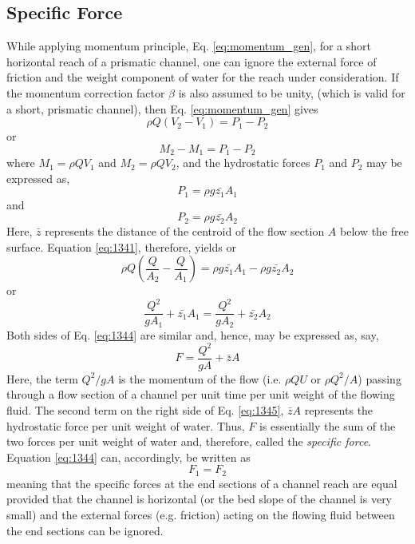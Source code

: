 \documentclass[a4paper, 12pt, british]{article} %
\numberwithin{equation}{section}
\numberwithin{figure}{section}
\numberwithin{table}{section}
\begin{document}
\subsection{Specific Force}
While applying momentum principle, Eq. \ref{eq:momentum_gen}, for a
short horizontal reach of a prismatic channel, one can
ignore the external force of friction and the weight
component of water for the reach under consideration. If the
momentum correction factor $\beta $ is also assumed to be
unity, (which is valid for a short, prismatic channel), then Eq. \ref{eq:momentum_gen}  gives 
\begin{equation}
\rho Q (V_2 - V_1) = P_1 - P_2
\label{eq:1341}
\end{equation}
or
\begin{equation*}
M_2 - M_1 = P_1 - P_2
\label{eq:1341a}
\end{equation*}
where $M_1 = \rho Q V_1$ and $M_2 = \rho Q V_2$, and
the hydrostatic forces $P_1$ and $P_2$ may be expressed as, 
\begin{equation}
P_1 = \rho g \bar{z_1} A_1
\label{eq:1342}
\end{equation}
and
\begin{equation}
P_2 = \rho g \bar{z_2} A_2
\label{eq:1343}
\end{equation}
Here, $\bar{z}$ represents the distance of the centroid of the flow
section $A$ below the free surface. Equation \ref{eq:1341}, therefore, yields
or
\begin{equation*}
\rho Q \left ( \frac{Q}{A_2} - \frac{Q}{A_1} \right ) = \rho g \bar{z_1} A_1 - \rho g \bar{z_2} A_2
\end{equation*}
or
\begin{equation}
\frac{Q^2}{g A_1} + \bar{z_1} A_1 = \frac{Q^2}{g A_2} + \bar{z_2} A_2
\label{eq:1344}
\end{equation}
Both sides of Eq. \ref{eq:1344} are similar and, hence, may
be expressed as, say, 
\begin{equation}
F = \frac{Q^2}{g A} + \bar{z} A
\label{eq:1345}
\end{equation}
Here, the term $Q^2 / g A$ is the momentum of the flow (i.e. $\rho Q U$ or $\rho Q^2 / A$) passing through a
flow section of a channel per unit time per unit weight of
the flowing fluid. The second term on the right side of Eq.
\ref{eq:1345}, $\bar{z}A$ represents the hydrostatic force per unit weight
of water. Thus, $F$ is essentially the sum of the two forces per
unit weight of water and, therefore, called the \emph{specific
	force}. Equation \ref{eq:1344} can, accordingly, be written as
\begin{equation*}
F_1 = F_2
\end{equation*}
meaning that the specific forces at the end sections of a
channel reach are equal provided that the channel is
horizontal (or the bed slope of the channel is very small)
and the external forces (e.g. friction) acting on the flowing fluid between
the end sections can be ignored. 
\end{document}
